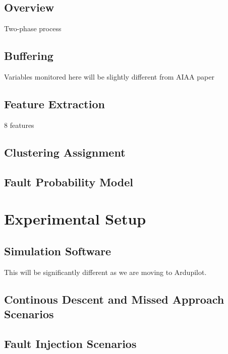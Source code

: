 \subsection{Overview}

Two-phase process

\subsection{Buffering}

Variables monitored here will be slightly different from AIAA paper

\subsection{Feature Extraction}

8 features

\subsection{Clustering Assignment}

\subsection{Fault Probability Model}


\section{Experimental Setup}

\subsection{Simulation Software}

This will be significantly different as we are moving to
Ardupilot. 

\subsection{Continous Descent and Missed Approach Scenarios}

\subsection{Fault Injection Scenarios}


